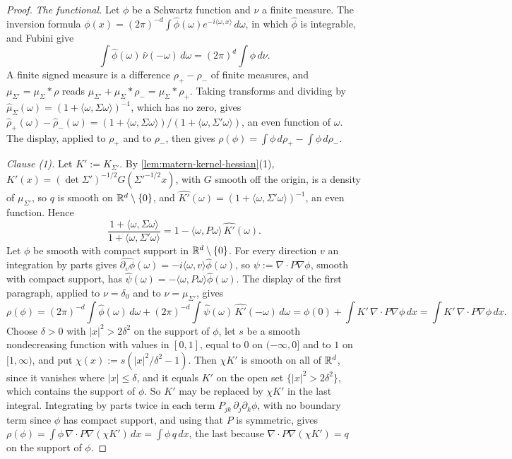 \begin{proof}
\leanok
\emph{The functional.} Let $\phi$ be a Schwartz function and $\nu$ a finite measure. The inversion
formula $\phi(x) = (2\pi)^{-d}\int\widehat\phi(\omega)e^{-i\langle\omega,x\rangle}\,d\omega$, in which
$\widehat\phi$ is integrable, and Fubini give
\[
  \int\widehat\phi(\omega)\,\widehat\nu(-\omega)\,d\omega = (2\pi)^d\int\phi\,d\nu .
\]
A finite signed measure is a difference $\rho_+ - \rho_-$ of finite measures, and
$\mu_{\Sigma'} = \mu_\Sigma * \rho$ reads $\mu_{\Sigma'} + \mu_\Sigma * \rho_- = \mu_\Sigma * \rho_+$.
Taking transforms and dividing by $\widehat\mu_\Sigma(\omega) = (1 + \langle\omega,\Sigma\omega\rangle)^{-1}$,
which has no zero, gives
$\widehat\rho_+(\omega) - \widehat\rho_-(\omega) = (1 + \langle\omega,\Sigma\omega\rangle)/(1 + \langle\omega,\Sigma'\omega\rangle)$,
an even function of $\omega$. The display, applied to $\rho_+$ and to $\rho_-$, then gives
$\rho(\phi) = \int\phi\,d\rho_+ - \int\phi\,d\rho_-$.

\emph{Clause (1).} Let $K' := K_{\Sigma'}$. By \ref{lem:matern-kernel-hessian}(1),
$K'(x) = (\det\Sigma')^{-1/2}G(\Sigma'^{-1/2}x)$, with $G$ smooth off the origin, is a density of
$\mu_{\Sigma'}$, so $q$ is smooth on $\mathbb{R}^d \setminus \{0\}$, and
$\widehat{K'}(\omega) = (1 + \langle\omega,\Sigma'\omega\rangle)^{-1}$, an even function. Hence
\[
  \frac{1 + \langle\omega,\Sigma\omega\rangle}{1 + \langle\omega,\Sigma'\omega\rangle}
  = 1 - \langle\omega,P\omega\rangle\,\widehat{K'}(\omega) .
\]
Let $\phi$ be smooth with compact support in $\mathbb{R}^d \setminus \{0\}$. For every direction $v$ an
integration by parts gives $\widehat{\partial_v\phi}(\omega) = -i\langle\omega,v\rangle\widehat\phi(\omega)$,
so $\psi := \nabla\cdot P\nabla\phi$, smooth with compact support, has
$\widehat\psi(\omega) = -\langle\omega,P\omega\rangle\widehat\phi(\omega)$. The display of the first
paragraph, applied to $\nu = \delta_0$ and to $\nu = \mu_{\Sigma'}$, gives
\[
  \rho(\phi) = (2\pi)^{-d}\int\widehat\phi(\omega)\,d\omega
    + (2\pi)^{-d}\int\widehat\psi(\omega)\,\widehat{K'}(-\omega)\,d\omega
  = \phi(0) + \int K'\,\nabla\cdot P\nabla\phi\,dx = \int K'\,\nabla\cdot P\nabla\phi\,dx .
\]
Choose $\delta > 0$ with $|x|^2 > 2\delta^2$ on the support of $\phi$, let $s$ be a smooth
nondecreasing function with values in $[0,1]$, equal to $0$ on $(-\infty,0]$ and to $1$ on
$[1,\infty)$, and put
$\chi(x) := s(|x|^2/\delta^2 - 1)$. Then $\chi K'$ is smooth on all of $\mathbb{R}^d$, since it vanishes
where $|x| \le \delta$, and it equals $K'$ on the open set $\{|x|^2 > 2\delta^2\}$, which contains the
support of $\phi$. So $K'$ may be replaced by $\chi K'$ in the last integral. Integrating by parts
twice in each term $P_{jk}\,\partial_j\partial_k\phi$, with no boundary term since $\phi$ has compact
support, and using that $P$ is symmetric, gives
$\rho(\phi) = \int\phi\,\nabla\cdot P\nabla(\chi K')\,dx = \int\phi\,q\,dx$, the last because
$\nabla\cdot P\nabla(\chi K') = q$ on the support of $\phi$.


\end{proof}
